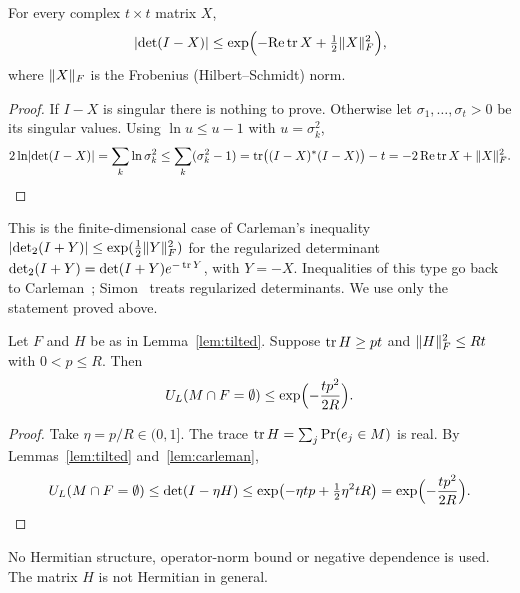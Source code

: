 \begin{lemma}\label{lem:carleman}
For every complex $t\times t$ matrix $X$,
\[
  \lvert \det(I-X)\rvert\le\exp\Bigl(-\mathrm{Re}\operatorname{tr} X+\tfrac12\lVert X\rVert_F^2\Bigr),
\]
where $\lVert X\rVert_F$ is the Frobenius (Hilbert--Schmidt) norm.
\end{lemma}

\begin{proof}
If $I-X$ is singular there is nothing to prove. Otherwise let $\sigma_1,\dots,\sigma_t>0$ be its singular values. Using $\ln u\le u-1$ with $u=\sigma_k^2$,
\[
  2\ln\lvert \det(I-X)\rvert=\sum_k\ln\sigma_k^2\le\sum_k(\sigma_k^2-1)=\operatorname{tr}\bigl((I-X)^*(I-X)\bigr)-t=-2\,\mathrm{Re}\operatorname{tr} X+\lVert X\rVert_F^2. \qedhere
\]
\end{proof}

This is the finite-dimensional case of Carleman's inequality $\lvert \det_2(I+Y)\rvert\le\exp(\frac12\lVert Y\rVert_F^2)$ for the regularized determinant $\det_2(I+Y)=\det(I+Y)e^{-\operatorname{tr} Y}$, with $Y=-X$. Inequalities of this type go back to Carleman~\cite{Carleman21}; Simon~\cite[Ch.~9]{Simon05} treats regularized determinants. We use only the statement proved above.

\begin{proposition}[avoidance]\label{prop:avoid}
Let $F$ and $H$ be as in Lemma~\ref{lem:tilted}. Suppose $\operatorname{tr} H\ge pt$ and $\lVert H\rVert_F^2\le Rt$ with $0<p\le R$. Then
\[
  U_L(M\cap F=\emptyset)\le\exp\Bigl(-\frac{tp^2}{2R}\Bigr).
\]
\end{proposition}

\begin{proof}
Take $\eta=p/R\in(0,1]$. The trace $\operatorname{tr} H=\sum_j\Pr(e_j\in M)$ is real. By Lemmas~\ref{lem:tilted} and~\ref{lem:carleman},
\[
  U_L(M\cap F=\emptyset)\le\det(I-\eta H)\le\exp\bigl(-\eta tp+\tfrac12\eta^2tR\bigr)=\exp\Bigl(-\frac{tp^2}{2R}\Bigr).\qedhere
\]
\end{proof}

No Hermitian structure, operator-norm bound or negative dependence is used. The matrix $H$ is not Hermitian in general.
